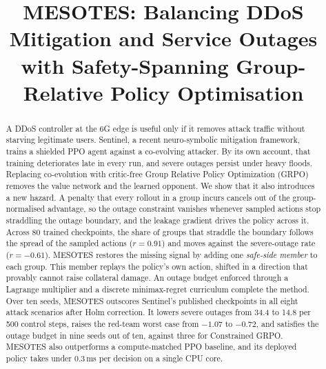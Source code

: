 \documentclass[conference]{IEEEtran}
\begin{document}
\title{MESOTES: Balancing DDoS Mitigation and Service Outages with Safety-Spanning Group-Relative Policy Optimisation}

\author{
}

\maketitle

\begin{abstract}
A DDoS controller at the 6G edge is useful only if it removes attack traffic without starving legitimate users. Sentinel, a recent neuro-symbolic mitigation framework, trains a shielded PPO agent against a co-evolving attacker. By its own account, that training deteriorates late in every run, and severe outages persist under heavy floods. Replacing co-evolution with critic-free Group Relative Policy Optimization (GRPO) removes the value network and the learned opponent. We show that it also introduces a new hazard. A penalty that every rollout in a group incurs cancels out of the group-normalised advantage, so the outage constraint vanishes whenever sampled actions stop straddling the outage boundary, and the leakage gradient drives the policy across it. Across 80 trained checkpoints, the share of groups that straddle the boundary follows the spread of the sampled actions ($r=0.91$) and moves against the severe-outage rate ($r=-0.61$). MESOTES restores the missing signal by adding one \emph{safe-side member} to each group. This member replays the policy's own action, shifted in a direction that provably cannot raise collateral damage. An outage budget enforced through a Lagrange multiplier and a discrete minimax-regret curriculum complete the method. Over ten seeds, MESOTES outscores Sentinel's published checkpoints in all eight attack scenarios after Holm correction. It lowers severe outages from 34.4 to 14.8 per 500 control steps, raises the red-team worst case from $-1.07$ to $-0.72$, and satisfies the outage budget in nine seeds out of ten, against three for Constrained GRPO. MESOTES also outperforms a compute-matched PPO baseline, and its deployed policy takes under 0.3\,ms per decision on a single CPU core.
\end{abstract}
\end{document}
